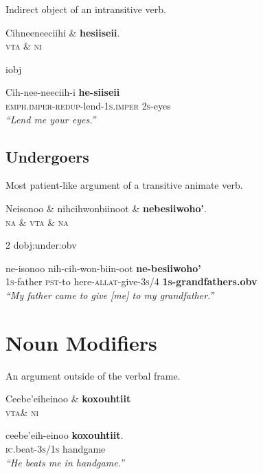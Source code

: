 \documentclass{handout}
\begin{document}
\begin{multicols}{2}
\begin{exe}
\ex \label{objse} Indirect object of an intransitive verb.\\%
\begin{dependency}
\begin{deptext}
Cihneeneeciihi \& \textbf{hesiiseii}.\\
\textsc{vta} \& \textsc{ni} \\
\end{deptext}
	{iobj}
\end{dependency}
\gll Cih-nee-neeciih-i \textbf{he-siiseii}\\
{\textsc{emph.imper-redup}-lend-\textsc{1s.imper}} {\textsc{2s}-eyes}\\
\trans \textit{``Lend me your eyes.''}
\end{exe}
\subsection{Undergoers} 
\footnotesize
\begin{exe}
\ex \label{under} Most patient-like argument of a transitive animate verb.\\
\begin{dependency}
\begin{deptext}
Neisonoo \& nihcihwonbiinoot \& \textbf{nebesiiwoho'}.\\
\textsc{na} \& \textsc{vta}	\& \textsc{na}\\
\end{deptext}
	{2}	{dobj:under:obv}
\end{dependency}
\gll ne-isonoo {nih-cih-won-biin-oot} \textbf{ne-besiiwoho'} \\
\textsc{1s}-father {\textsc{pst}-to here-\textsc{allat}-give-\textsc{3s/4}} \textbf{\textsc{1s}-grandfathers.obv}\\
\trans \textit{``My father came to give [me] to my grandfather.''}
\end{exe}

\section{Noun Modifiers}
\footnotesize
\begin{exe}
\ex \label{handgame} An argument outside of the verbal frame.\\
\begin{dependency}
\begin{deptext}
Ceebe'eiheinoo \& \textbf{koxouhtiit}\\
\textsc{vta}\& \textsc{ni}\\
\end{deptext}
\end{dependency}
\gll ceebe'eih-einoo \textbf{koxouhtiit}.\\
\textsc{ic}.beat-\textsc{3s/1s} handgame\\
\trans \textit{``He beats me in handgame.''}
\end{exe}


\end{multicols}
\end{document}
